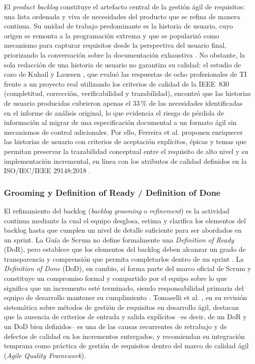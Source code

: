 \documentclass[journal,onecolumn]{IEEEtran}
\begin{document}
	El \textit{product backlog} constituye el artefacto central de la gestión ágil de requisitos: una lista ordenada y viva de necesidades del producto que se refina de manera continua. Su unidad de trabajo predominante es la historia de usuario, cuyo origen se remonta a la programación extrema y que se popularizó como mecanismo para capturar requisitos desde la perspectiva del usuario final, priorizando la conversación sobre la documentación exhaustiva \cite{Ferreira2022}. No obstante, la sola redacción de una historia de usuario no garantiza su calidad: el estudio de caso de Kuhail y Lauesen \cite{Kuhail2022}, que evaluó las respuestas de ocho profesionales de TI frente a un proyecto real utilizando los criterios de calidad de la IEEE~830 (completitud, corrección, verificabilidad y trazabilidad), encontró que las historias de usuario producidas cubrieron apenas el 33\,\% de las necesidades identificadas en el informe de análisis original, lo que evidencia el riesgo de pérdida de información al migrar de una especificación documental a un formato ágil sin mecanismos de control adicionales. Por ello, Ferreira et al. \cite{Ferreira2022} proponen enriquecer las historias de usuario con criterios de aceptación explícitos, épicas y temas que permitan preservar la trazabilidad conceptual entre el requisito de alto nivel y su implementación incremental, en línea con los atributos de calidad definidos en la ISO/IEC/IEEE 29148:2018 \cite{ISO29148-2018}.
	
	\subsubsection{Grooming y Definition of Ready / Definition of Done}
	
	El refinamiento del backlog (\textit{backlog grooming} o \textit{refinement}) es la actividad continua mediante la cual el equipo desglosa, estima y clarifica los elementos del backlog hasta que cumplen un nivel de detalle suficiente para ser abordados en un sprint. La Guía de Scrum no define formalmente una \textit{Definition of Ready} (DoR), pero establece que los elementos del backlog deben alcanzar un grado de transparencia y comprensión que permita completarlos dentro de un sprint \cite{ScrumGuide2020}. La \textit{Definition of Done} (DoD), en cambio, sí forma parte del marco oficial de Scrum y constituye un compromiso formal y compartido por el equipo sobre lo que significa que un incremento esté terminado, siendo responsabilidad primaria del equipo de desarrollo mantener su cumplimiento \cite{ScrumGuide2020}. Tomaselli et al. \cite{Tomaselli2025}, en su revisión sistemática sobre métodos de gestión de requisitos en desarrollo ágil, destacan que la ausencia de criterios de entrada y salida explícitos --es decir, de un DoR y un DoD bien definidos-- es una de las causas recurrentes de retrabajo y de defectos de calidad en los incrementos entregados, y recomiendan su integración temprana como práctica de gestión de requisitos dentro del marco de calidad ágil (\textit{Agile Quality Framework}).
	
\end{document}
